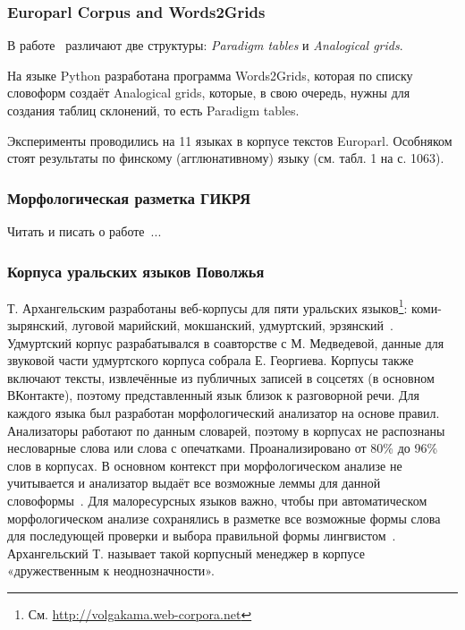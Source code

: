  \subsubsection{Europarl Corpus and Words2Grids}

В работе~\cite{Fam2018tools} различают две структуры: \emph{Paradigm tables} 
и \emph{Analogical grids}. 

На языке Python разработана программа Words2Grids, которая по списку словоформ 
создаёт Analogical grids, которые, в свою очередь, нужны для создания 
таблиц склонений, то есть Paradigm tables.

Эксперименты проводились на 11 языках в корпусе текстов Europarl. 
Особняком стоят результаты по финскому (агглюнативному) языку (см. табл. 1 на с. 1063).


\subsubsection{Морфологическая разметка ГИКРЯ}

Читать и писать о работе~\cite{Selegey2016}...

\subsubsection{Корпуса уральских языков Поволжья}
Т. Архангельским разработаны веб-корпусы для пяти уральских языков\footnote{См. \url{http://volgakama.web-corpora.net}}: коми-зырянский, луговой марийский, мокшанский, удмуртский, эрзянский~\cite{Arkhangelskiy2020}. Удмуртский корпус разрабатывался в соавторстве с М. Медведевой, данные для звуковой части удмуртского корпуса собрала Е. Георгиева. Корпусы также включают тексты, извлечённые из публичных записей в соцсетях (в основном ВКонтакте), поэтому представленный язык близок к разговорной речи. Для каждого языка был разработан морфологический анализатор на основе правил. Анализаторы работают по данным словарей, поэтому в корпусах не распознаны несловарные слова или слова с опечатками. Проанализировано от 80\% до 96\% слов в корпусах. В основном контекст при морфологическом анализе не учитывается и анализатор выдаёт все возможные леммы для данной словоформы~\cite[58--59]{Arkhangelskiy2020}. Для малоресурсных языков важно, чтобы при автоматическом морфологическом анализе сохранялись в разметке все возможные формы слова для последующей проверки и выбора правильной формы лингвистом~\cite[61]{Arkhangelskiy2020}. Архангельский Т. называет такой корпусный менеджер в корпусе «дружественным к неоднозначности».

